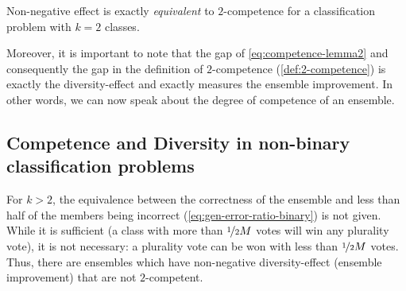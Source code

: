 \documentclass[../main.tex]{subfiles}
\begin{document}
\begin{corollary}
    \label{thm:2-competence-div-eff}
    Non-negative effect is exactly \textit{equivalent} to $2$-competence for a classification problem with $k=2$ classes.
\end{corollary} 

Moreover, it is important to note that the gap of \cref{eq:competence-lemma2} and consequently the gap in the definition of $2$-competence (\cf \ref{def:2-competence}) is exactly the diversity-effect and exactly measures the ensemble improvement. In other words, we can now speak about the degree of competence of an ensemble.

\subsection{Competence and Diversity in non-binary classification problems}
\label{sec:k-competence}
For $k>2$, the equivalence between the correctness of the ensemble and less than half of the members being incorrect (\cf \ref{eq:gen-error-ratio-binary}) is not given. While it is sufficient (a class with more than $\nicefrac{1}{2}M$ votes will win any plurality vote), it is not necessary: a plurality vote can be won with less than $\nicefrac{1}{2}M$ votes. Thus, there are ensembles which have non-negative diversity-effect (ensemble improvement) that are not $2$-competent. %
\end{document}
